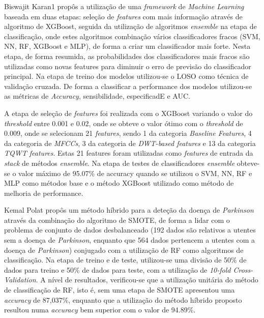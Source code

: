 \documentclass[12pt,a4paper,twoside]{report}
\begin{document}
{Biswajit Karan1 \cite{Karan2023} propôs a utilização de uma \textit{framework} de \textit{Machine Learning} baseada em duas etapas: seleção de \textit{features} com mais informação através de algoritmo de \gls{XGBoost}, seguida da utilização de algoritmos \textit{ensemble} na etapa de classificação, onde estes algoritmos combinação vários classificadores fracos (\gls{SVM}, \Gls{NN}, \Gls{RF}, \gls{XGBoost} e \gls{MLP}), de forma a criar um classificador mais forte. Nesta etapa, de forma resumida, as probabilidades dos classificadores mais fracos são utilizadas como novas features para diminuir o erro de previsão do classificador principal. Na etapa de treino dos modelos utilizou-se o \gls{LOSO} como técnica de validação cruzada. De forma a classificar a performance dos modelos utilizou-se as métricas de \textit{Accuracy}, sensibilidade, especificadE e \gls{AUC}.

A etapa de seleção de \textit{features} foi realizada com o \gls{XGBoost} variando o valor do \textit{threshold} entre 0.001 e 0.02, onde se obteve o valor ótimo com o \textit{threshold} de 0.009, onde se selecionam 21 \textit{features}, sendo 1 da categoria \textit{Baseline Features}, 4 da categoria de \textit{MFCCs}, 3 da categoria de \textit{DWT-based features} e 13 da categoria \textit{TQWT features}. Estas 21 features foram utilizadas como \textit{features} de entrada da \textit{stack} de métodos \textit{ensemble}. Na etapa de testes de classificadores \textit{ensemble} obteve-se o valor máximo de 95.07\% de accuracy quando se utilizou o \gls{SVM}, \gls{NN}, \gls{RF} e \gls{MLP} como métodos base e o método \gls{XGBoost} utilizado como método de melhoria de performance.

Kemal Polat  \cite{Polat2019} propôs um método híbrido para a deteção da doença de \textit{Parkinson} através da combinação do algoritmo de \gls{SMOTE}, de forma a lidar com o problema de conjunto de dados desbalanceado (192 dados são relativos a utentes sem a doença de \textit{Parkinson}, enquanto que 564 dados pertencem a utentes com a doença de \textit{Parkinson}) conjugado com a utilização de \gls{RF} como algoritmos de classificação. Na etapa de treino e de teste, utilizou-se uma divisão de 50\% de dados para treino e 50\% de dados para teste, com a utilização de \textit{10-fold Cross-Validation}. A nível de resultados, verificou-se que a utilização unitária do método de classificação de \gls{RF}, isto é, sem uma etapa de \gls{SMOTE} apresentou uma \textit{accuracy} de 87,037\%, enquanto que a utilização do método híbrido proposto resultou numa \textit{accuracy} bem superior com o valor de 94.89\%.




}
\end{document}

